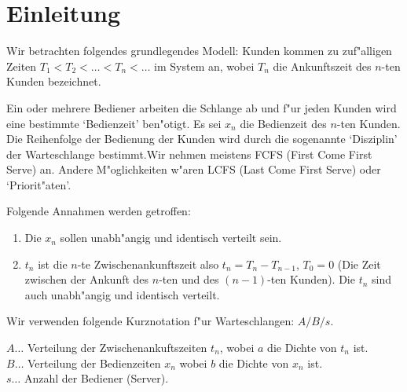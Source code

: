 \chapter{Einleitung}
Wir betrachten folgendes grundlegendes Modell:  Kunden kommen zu
zuf"alligen Zeiten  $T_{1} < T_{2} < \dots <T_{n} < \dots$ im System an,
wobei $T_{n}$
die Ankunftszeit des $n$-ten Kunden bezeichnet.

Ein oder mehrere Bediener arbeiten die Schlange ab und f"ur jeden Kunden
wird eine bestimmte `Bedienzeit' ben"otigt. Es sei $x_{n}$ die Bedienzeit
des $n$-ten Kunden. 
Die Reihenfolge der Bedienung der Kunden wird durch
die sogenannte `Disziplin' der Warteschlange bestimmt.Wir nehmen meistens
FCFS (First Come First Serve) an. Andere M"oglichkeiten w"aren LCFS (Last
Come First Serve) oder `Priorit"aten'.

Folgende Annahmen werden getroffen:
\begin{enumerate}
\item Die $x_{n}$ sollen unabh"angig und identisch verteilt sein. 
\item $t_{n}$ ist die $n$-te Zwischenankunftszeit also $t_{n}= T_{n} - 
T_{n-1}$,  $T_{0}=0$ (Die Zeit zwischen der Ankunft des $n$-ten und des
$(n-1)$-ten Kunden). Die $t_{n}$ sind auch unabh"angig und identisch
verteilt. 
\end{enumerate}
Wir verwenden folgende Kurznotation f"ur
Warteschlangen: $A/B/s$.

$A \dots$ Verteilung der Zwischenankuftszeiten $t_{n}$, wobei $a$ die Dichte
von $t_{n}$ ist. \\
$B \dots$ Verteilung der Bedienzeiten $x_{n}$ wobei $b$ die Dichte von
$x_{n}$ ist. \\
$s \dots$ Anzahl der Bediener (Server).

